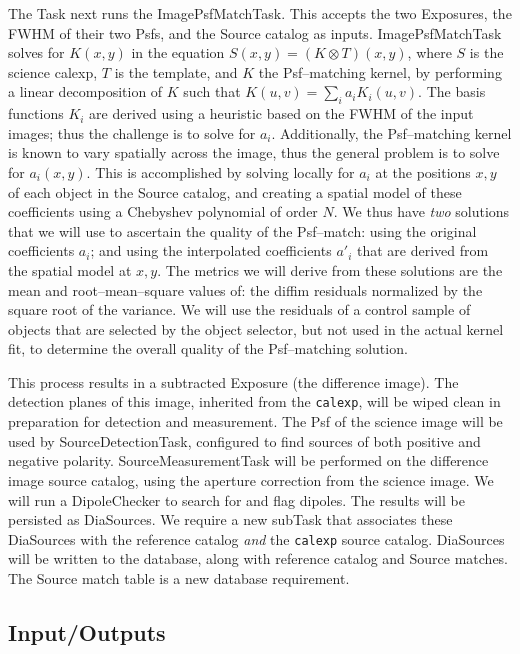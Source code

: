 \documentclass[prd, nofootinbib, floatfix, 11pt,tightenlines,times]{article}
\begin{document}
The Task next runs the ImagePsfMatchTask.  This accepts the two
Exposures, the FWHM of their two Psfs, and the Source catalog as
inputs.  ImagePsfMatchTask solves for $K(x,y)$ in the
equation $S(x,y) = (K \otimes T)(x,y)$, where $S$ is the science
calexp, $T$ is the template, and $K$ the Psf--matching kernel, by
performing a linear decomposition of $K$ such that $K(u,v) = \sum_i
a_i K_i(u,v)$.  The basis functions $K_i$ are derived using a
heuristic based on the FWHM of the input images; thus the challenge is to solve for $a_i$.
Additionally, the Psf--matching kernel is known to vary spatially
across the image, thus the general problem is to solve for $a_i(x,y)$.
This is accomplished by solving locally for $a_i$ at the positions
$x,y$ of each object in the Source catalog, and creating a spatial
model of these coefficients using a Chebyshev polynomial of order $N$.
We thus have {\it two} solutions that we will use to ascertain the
quality of the Psf--match: using the original coefficients $a_i$; and
using the interpolated coefficients $a{'}_i$ that are derived from the
spatial model at $x,y$.  The metrics we will derive from these
solutions are the mean and root--mean--square values of: the diffim
residuals normalized by the square root of the variance.  We will use
the residuals of a control sample of objects that are selected by the
object selector, but not used in the actual kernel fit, to determine
the overall quality of the Psf--matching solution.

This process results in a subtracted Exposure (the difference image).
The detection planes of this image, inherited from the {\tt calexp},
will be wiped clean in preparation for detection and measurement.  The
Psf of the science image will be used by SourceDetectionTask,
configured to find sources of both positive and negative polarity.
SourceMeasurementTask will be performed on the difference image source
catalog, using the aperture correction from the science image.  We
will run a DipoleChecker to search for and flag
dipoles.  The results will be persisted as DiaSources.  We require a
new subTask that associates these DiaSources with the reference
catalog {\it and} the {\tt calexp} source catalog.  DiaSources will be written to the database,
along with reference catalog and Source matches.  The Source match
table is a new database requirement.

\subsection{Input/Outputs}
\end{document}
